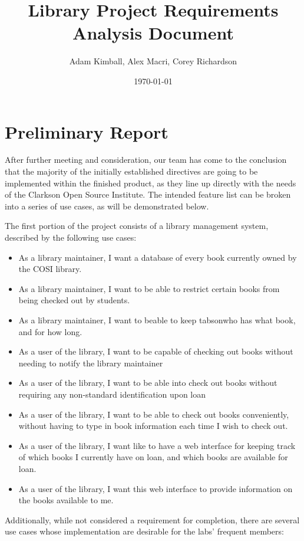 \documentclass[a4paper, 10pt, oneside, draft]{article}
\title{Library Project Requirements Analysis Document}
\date{\today}
\author{Adam Kimball, Alex Macri, Corey Richardson}
\begin{document}
\maketitle
\newpage

\tableofcontents
\newpage

\section{Preliminary Report}

After further meeting and consideration, our team has come to the conclusion that the majority of the
initially established directives are going to be implemented within the finished product, as they line
up directly with the needs of the Clarkson Open Source Institute. The intended feature list can be broken
into a series of use cases, as will be demonstrated below.

The first portion of the project consists of a library management system, described by the following use
cases:

\begin{itemize}
	\item As a library maintainer, I want a database of every book currently owned by the COSI library.
	\item As a library maintainer, I want to be able to restrict certain books from being checked out by students.
	\item As a library maintainer, I want to beable to keep tabsonwho has what book, and for how long.
	\item As a user of the library, I want to be capable of checking out books without needing to notify the library maintainer
	\item As a user of the library, I want to be able into check out books without requiring any non-standard identification upon loan
	\item As a user of the library, I want to be able to check out books conveniently, without having to type in book information each time I wish to check out.
	\item As a user of the library, I want like to have a web interface for keeping track of which books I currently have on loan, and which books are
available for loan.
	\item As a user of the library, I want this web interface to provide information on the books available to me.
\end{itemize}

Additionally, while not considered a requirement for completion, there are several use cases whose implementation are desirable for the labs' frequent members:
\end{document}
